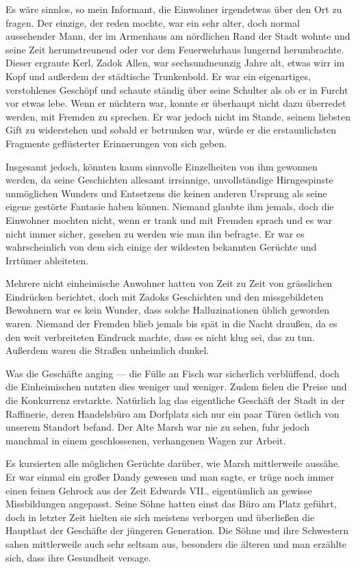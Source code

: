 Es wäre sinnlos, so mein Informant, die Einwohner irgendetwas über den Ort zu fragen. Der einzige, der reden mochte, war ein sehr alter, doch normal aussehender Mann, der im Armenhaus am nördlichen Rand der Stadt wohnte und seine Zeit herumstreunend oder vor dem Feuerwehrhaus lungernd herumbrachte. Dieser ergraute Kerl, Zadok Allen, war sechsundneunzig Jahre alt, etwas wirr im Kopf und außerdem der städtische Trunkenbold. Er war ein eigenartiges, verstohlenes Geschöpf und schaute ständig über seine Schulter als ob er in Furcht vor etwas lebe. Wenn er nüchtern war, konnte er überhaupt nicht dazu überredet werden, mit Fremden zu sprechen. Er war jedoch nicht im Stande, seinem liebsten Gift zu widerstehen und sobald er betrunken war, würde er die erstaunlichsten Fragmente geflüsterter Erinnerungen von sich geben.

Insgesamt jedoch, könnten kaum sinnvolle Einzelheiten von ihm gewonnen werden, da seine Geschichten allesamt irrsinnige, unvollständige Hirngespinste unmöglichen Wunders und Entsetzens die keinen anderen Ursprung als seine eigene gestörte Fantasie haben können. Niemand glaubte ihm jemals, doch die Einwohner mochten nicht, wenn er trank und mit Fremden sprach und es war nicht immer sicher, gesehen zu werden wie man ihn befragte. Er war es wahrscheinlich von dem sich einige der wildesten bekannten Gerüchte und Irrtümer ableiteten.

Mehrere nicht einheimische Anwohner hatten von Zeit zu Zeit von grässlichen Eindrücken berichtet, doch mit Zadoks Geschichten und den missgebildeten Bewohnern war es kein Wunder, dass solche Halluzinationen üblich geworden waren. Niemand der Fremden blieb jemals bis spät in die Nacht draußen, da es den weit verbreiteten Eindruck machte, dass es nicht klug sei, das zu tun. Außerdem waren die Straßen unheimlich dunkel.

Was die Geschäfte anging --- die Fülle an Fisch war sicherlich verblüffend, doch die Einheimischen nutzten dies weniger und weniger. Zudem fielen die Preise und die Konkurrenz erstarkte. Natürlich lag das eigentliche Geschäft der Stadt in der Raffinerie, deren Handelsbüro am Dorfplatz sich nur ein paar Türen östlich von unserem Standort befand. Der Alte Marsh war nie zu sehen, fuhr jedoch manchmal in einem geschlossenen, verhangenen Wagen zur Arbeit.

Es kursierten alle möglichen Gerüchte darüber, wie Marsh mittlerweile aussähe. Er war einmal ein großer Dandy gewesen und man sagte, er trüge noch immer einen feinen Gehrock aus der Zeit Edwards VII., eigentümlich an gewisse Missbildungen angepasst. Seine Söhne hatten einst das Büro am Platz geführt, doch in letzter Zeit hielten sie sich meistens verborgen und überließen die Hauptlast der Geschäfte der jüngeren Generation. Die Söhne und ihre Schwestern sahen mittlerweile auch sehr seltsam aus, besonders die älteren und man erzählte sich, dass ihre Gesundheit versage.

